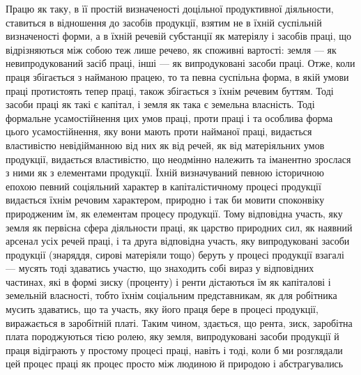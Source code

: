 Працю як таку, в її простій визначеності доцільної продуктивної діяльности,
ставиться в відношення до засобів продукції, взятим не в їхній суспільній
визначеності форми, а в їхній речевій субстанції як матеріялу і засобів праці,
що відрізняються між собою теж лише речево, як споживні вартості: земля —
як невипродукований засіб праці, інші — як випродуковані засоби праці. Отже,
коли праця збігається з найманою працею, то та певна суспільна форма, в
якій умови праці протистоять тепер праці, також збігається з їхнім речевим
буттям. Тоді засоби праці як такі є капітал, і земля як така є земельна
власність. Тоді формальне усамостійнення цих умов праці, проти праці і та
особлива форма цього усамостійнення, яку вони мають проти найманої праці, видається
властивістю невідійманною від них як від речей, як від матеріяльних умов
продукції, видається властивістю, що неодмінно належить та іманентно зрослася
з ними як з елементами продукції. Їхній визначуваний певною історичною
епохою певний соціяльний характер в капіталістичному процесі продукції видається
їхнім речовим характером, природно і так би мовити споконвіку природженим
їм, як елементам процесу продукції. Тому відповідна участь, яку земля
як первісна сфера діяльности праці, як царство природних сил, як наявний
арсенал усіх речей праці, і та друга відповідна участь, яку випродуковані засоби
продукції (знаряддя, сирові матеріяли тощо) беруть у процесі продукції
взагалі — мусять тоді здаватись участю, що знаходить собі вираз у відповідних
частинах, які в формі зиску (проценту) і ренти дістаються їм як капіталові і
земельній власності, тобто їхнім соціальним представникам, як для робітника
мусить здаватись, що та участь, яку його праця бере в процесі продукції,
виражається в заробітній платі. Таким чином, здається, що рента, зиск, заробітна
плата породжуються тією ролею, яку земля, випродуковані засоби продукції й
праця відіграють у простому процесі праці, навіть і тоді, коли б ми розглядали
цей процес праці як процес просто між людиною й природою і абстрагувались
\parbreak{}  %
